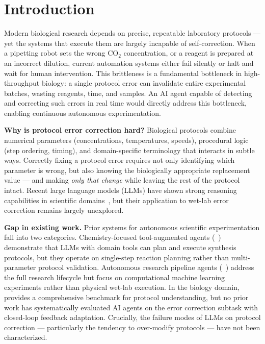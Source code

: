 \section{Introduction}
\label{sec:intro}

Modern biological research depends on precise, repeatable laboratory protocols --- yet the systems that execute them are largely incapable of self-correction.
When a pipetting robot sets the wrong CO$_2$ concentration, or a reagent is prepared at an incorrect dilution, current automation systems either fail silently or halt and wait for human intervention.
This brittleness is a fundamental bottleneck in high-throughput biology: a single protocol error can invalidate entire experimental batches, wasting reagents, time, and samples.
An AI agent capable of detecting and correcting such errors in real time would directly address this bottleneck, enabling continuous autonomous experimentation.

{\bf Why is protocol error correction hard?}
Biological protocols combine numerical parameters (concentrations, temperatures, speeds), procedural logic (step ordering, timing), and domain-specific terminology that interacts in subtle ways.
Correctly fixing a protocol error requires not only identifying which parameter is wrong, but also knowing the biologically appropriate replacement value --- and making \emph{only that change} while leaving the rest of the protocol intact.
Recent large language models (LLMs) have shown strong reasoning capabilities in scientific domains~\cite{bran2023chemcrow,schmidgall2025agentlab}, but their application to wet-lab error correction remains largely unexplored.

{\bf Gap in existing work.}
Prior systems for autonomous scientific experimentation fall into two categories.
Chemistry-focused tool-augmented agents (\eg \chemcrow~\cite{bran2023chemcrow}) demonstrate that LLMs with domain tools can plan and execute synthesis protocols, but they operate on single-step reaction planning rather than multi-parameter protocol validation.
Autonomous research pipeline agents (\eg \agentlab~\cite{schmidgall2025agentlab}) address the full research lifecycle but focus on computational machine learning experiments rather than physical wet-lab execution.
In the biology domain, \bioprobench~\cite{bioprobench2025} provides a comprehensive benchmark for protocol understanding, but no prior work has systematically evaluated AI agents on the error correction subtask with closed-loop feedback adaptation.
Crucially, the failure modes of LLMs on protocol correction --- particularly the tendency to over-modify protocols --- have not been characterized.

